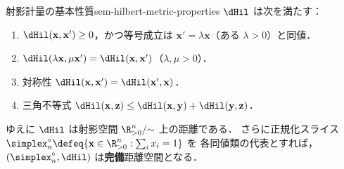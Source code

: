 \begin{claim}{射影計量の基本性質}{sem-hilbert-metric-properties}
  $\dHil$ は次を満たす：
  \begin{enumerate}
    \item $\dHil(\mathbf{x}, \mathbf{x}') \geq 0$，かつ等号成立は $\mathbf{x}' = \lambda\mathbf{x}$（ある $\lambda>0$）と同値．
    \item $\dHil(\lambda\mathbf{x}, \mu\mathbf{x}') = \dHil(\mathbf{x}, \mathbf{x}')$（$\lambda, \mu > 0$）．
    \item 対称性 $\dHil(\mathbf{x}, \mathbf{x}') = \dHil(\mathbf{x}', \mathbf{x})$．
    \item 三角不等式 $\dHil(\mathbf{x}, \mathbf{z}) \leq \dHil(\mathbf{x}, \mathbf{y}) + \dHil(\mathbf{y}, \mathbf{z})$．
  \end{enumerate}
  ゆえに $\dHil$ は射影空間 $\R_{>0}^n / {\sim}$ 上の距離である．
  さらに正規化スライス $\simplex_n^\circ \defeq \{\mathbf{x} \in \R_{>0}^n : \sum_i x_i = 1\}$ を
  各同値類の代表とすれば，$(\simplex_n^\circ, \dHil)$ は\textbf{完備}距離空間となる．
\end{claim}


